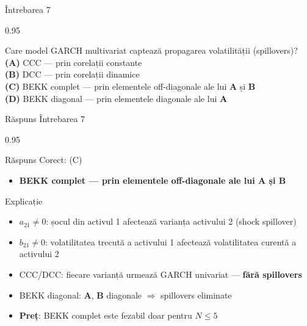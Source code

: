 \documentclass[9pt, aspectratio=169, t]{beamer}
\begin{document}
\begin{frame}{Întrebarea 7}
    \begin{cminipage}{0.95\textwidth}
    \begin{block}{Care model GARCH multivariat captează propagarea volatilității (spillovers)?}
        \textcolor{MainBlue}{\textbf{(A)}} CCC --- prin corelații constante\\[3pt]
        \textcolor{MainBlue}{\textbf{(B)}} DCC --- prin corelații dinamice\\[3pt]
        \textcolor{MainBlue}{\textbf{(C)}} BEKK complet --- prin elementele off-diagonale ale lui $\mathbf{A}$ și $\mathbf{B}$\\[3pt]
        \textcolor{MainBlue}{\textbf{(D)}} BEKK diagonal --- prin elementele diagonale ale lui $\mathbf{A}$
    \end{block}
    \end{cminipage}
\end{frame}

\begin{frame}{Răspuns Întrebarea 7}
    \begin{cminipage}{0.95\textwidth}
    \begin{exampleblock}{Răspuns Corect: (C)}
        \begin{itemize}\setlength{\itemsep}{0pt}
            \item \textbf{BEKK complet --- prin elementele off-diagonale ale lui $\mathbf{A}$ și $\mathbf{B}$}
        \end{itemize}
    \end{exampleblock}

    \pause
    \begin{block}{Explicație}
        \begin{itemize}\setlength{\itemsep}{0pt}
            \item $a_{21} \neq 0$: șocul din activul 1 afectează varianța activului 2 (shock spillover)
            \item $b_{21} \neq 0$: volatilitatea trecută a activului 1 afectează volatilitatea curentă a activului 2
            \item CCC/DCC: fiecare varianță urmează GARCH univariat --- \textbf{fără spillovers}
            \item BEKK diagonal: $\mathbf{A}$, $\mathbf{B}$ diagonale $\Rightarrow$ spillovers eliminate
            \item \textbf{Preț}: BEKK complet este fezabil doar pentru $N \leq 5$
        \end{itemize}
    \end{block}
    \end{cminipage}
\end{frame}
\end{document}
